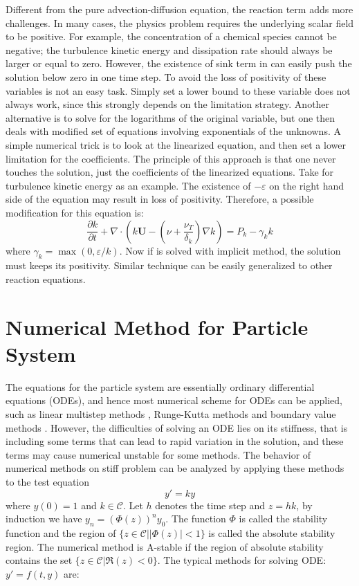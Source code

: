 Different from the pure advection-diffusion equation, the reaction term adds more challenges. In many cases, the physics problem requires the underlying scalar field to be positive. For example, the concentration of a chemical species cannot be negative; the turbulence kinetic energy and dissipation rate should always be larger or equal to zero. However, the existence of sink term in  can easily push the solution below zero in one time step. To avoid the loss of positivity of these variables is not an easy task. Simply set a lower bound to these variable does not always work, since this strongly depends on the limitation strategy. Another alternative is to solve for the logarithms of the original variable, but one then deals with modified set of equations involving exponentials of the unknowns. A simple numerical trick is to look at the linearized equation, and then set a lower limitation for the coefficients. The principle of this approach is that one never touches the solution, just the coefficients of the linearized equations. Take  for turbulence kinetic energy as an example. The existence of $-\varepsilon$ on the right hand side of the equation may result in loss of positivity. Therefore, a possible modification for this equation is:
\begin{equation}
\frac{\partial k}{\partial t}
+\nabla\cdot(k\mathbf{U}
-(\nu+\frac{\nu_T}{\delta_k})\nabla k) 
= P_k - \gamma_k k
\label{mdf_k_eqn}
\end{equation}
where $\gamma_k = \max(0, \varepsilon/k)$. Now if  is solved with implicit method, the solution must keeps its positivity. Similar technique can be easily generalized to other reaction equations.

\section{Numerical Method for Particle System}
The equations for the particle system are essentially ordinary differential equations (ODEs), and hence most numerical scheme for ODEs can be applied, such as linear multistep methods \cite{}, Runge-Kutta methods \cite{} and boundary value methods \cite{}. However, the difficulties of solving an ODE lies on its stiffness, that is including some terms that can lead to rapid variation in the solution, and these terms may cause numerical unstable for some methods. The behavior of numerical methods on stiff problem can be analyzed by applying these methods to the test equation
\begin{equation}
y' = k y
\label{test_eqn}
\end{equation}   
where $y(0) = 1$ and $k \in \mathcal{C}$. Let $h$ denotes the time step and $z = hk$, by induction we have $y_n = (\Phi(z))^ny_0$. The function $\Phi$ is called the stability function and the region of $\{z\in \mathcal{C}| |\Phi(z)| < 1\}$ is called the absolute stability region. The numerical method is A-stable if the region of absolute stability contains the set $\{ z \in \mathcal{C}| \Re(z) < 0\}$. The typical methods for solving ODE: $y' = f(t,y)$ are:

